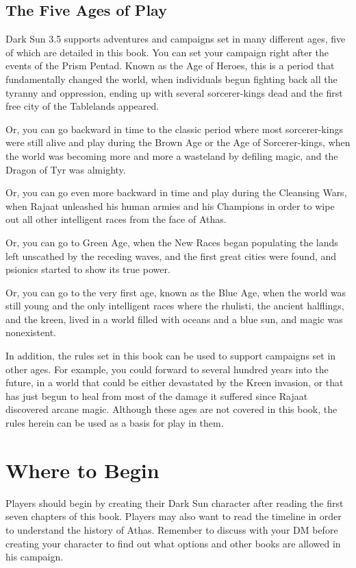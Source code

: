 \subsection{The Five Ages of Play}
{\tableheader Dark Sun} 3.5 supports adventures and campaigns set in many different ages, five of which are detailed in this book. You can set your campaign right after the events of the Prism Pentad. Known as the Age of Heroes, this is a period that fundamentally changed the world, when individuals begun fighting back all the tyranny and oppression, ending up with several sorcerer-kings dead and the first free city of the Tablelands appeared.

Or, you can go backward in time to the classic period where most sorcerer-kings were still alive and play during the Brown Age or the Age of Sorcerer-kings, when the world was becoming more and more a wasteland by defiling magic, and the Dragon of Tyr was almighty.

Or, you can go even more backward in time and play during the Cleansing Wars, when Rajaat unleashed his human armies and his Champions in order to wipe out all other intelligent races from the face of Athas.

Or, you can go to Green Age, when the New Races began populating the lands left unscathed by the receding waves, and the first great cities were found, and psionics started to show its true power.

Or, you can go to the very first age, known as the Blue Age, when the world was still young and the only intelligent races where the rhulisti, the ancient halflings, and the kreen, lived in a world filled with oceans and a blue sun, and magic was nonexistent.

In addition, the rules set in this book can be used to support campaigns set in other ages. For example, you could forward to several hundred years into the future, in a world that could be either devastated by the Kreen invasion, or that has just begun to heal from most of the damage it suffered since Rajaat discovered arcane magic. Although these ages are not covered in this book, the rules herein can be used as a basis for play in them.

\section{Where to Begin}
Players should begin by creating their {\tableheader Dark Sun} character after reading the first seven chapters of this book. Players may also want to read the timeline in order to understand the history of Athas. Remember to discuss with your DM before creating your character to find out what options and other books are allowed in his campaign.

